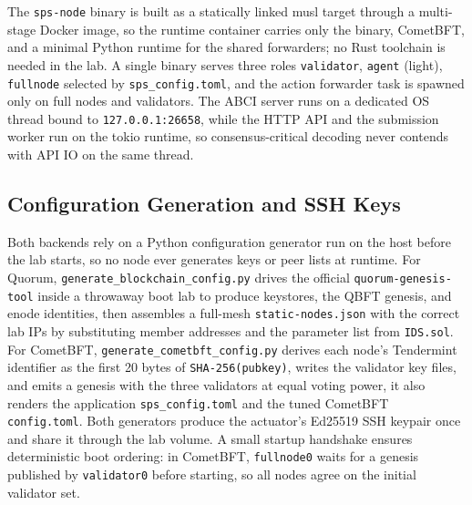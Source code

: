 The \texttt{sps-node} binary is built as a statically linked musl target through a multi-stage Docker image, so the runtime container carries only the binary, CometBFT, and a minimal Python runtime for the shared forwarders; no Rust toolchain is needed in the lab. A single binary serves three roles \texttt{validator}, \texttt{agent} (light), \texttt{fullnode} selected by \texttt{sps\_config.toml}, and the action forwarder task is spawned only on full nodes and validators. The ABCI server runs on a dedicated OS thread bound to \texttt{127.0.0.1:26658}, while the HTTP API and the submission worker run on the tokio runtime, so consensus-critical decoding never contends with API IO on the same thread.

\subsection{Configuration Generation and SSH Keys}
\label{subsec:impl_config_gen}

Both backends rely on a Python configuration generator run on the host before the lab starts, so no node ever generates keys or peer lists at runtime. For Quorum, \texttt{generate\_blockchain\_config.py} drives the official \texttt{quorum-genesis-tool} inside a throwaway boot lab to produce keystores, the QBFT genesis, and enode identities, then assembles a full-mesh \texttt{static-nodes.json} with the correct lab IPs by substituting member addresses and the parameter list from \texttt{IDS.sol}. For CometBFT, \texttt{generate\_cometbft\_config.py} derives each node's Tendermint identifier as the first 20 bytes of \texttt{SHA-256(pubkey)}, writes the validator key files, and emits a genesis with the three validators at equal voting power, it also renders the application \texttt{sps\_config.toml} and the tuned CometBFT \texttt{config.toml}. Both generators produce the actuator's Ed25519 SSH keypair once and share it through the lab volume. A small startup handshake ensures deterministic boot ordering: in CometBFT, \texttt{fullnode0} waits for a genesis published by \texttt{validator0} before starting, so all nodes agree on the initial validator set.
